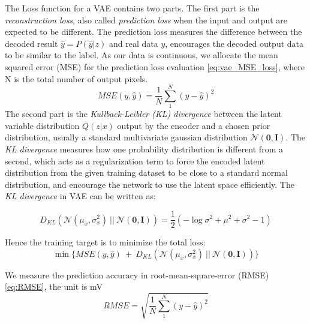 The Loss function for a VAE contains two parts. The first part is the \textit{reconstruction loss}, also called \textit{prediction loss} when the input and output are expected to be different. The prediction loss measures the difference between the decoded result $\hat{y} = P(\hat{y}|z)$ and real data $y$, encourages the decoded output data to be similar to the label. As our data is continuous, we allocate the mean squared error (MSE) for the prediction loss evaluation \eqref{eq:vae_MSE_loss}, where N is the total number of output pixels.
\begin{equation}
	\label{eq:vae_MSE_loss}
	\textit{MSE}(y, \hat{y}) = \frac{1}{N} \sum_{1}^{N} ( y - \hat{y})^{2}
\end{equation}
The second part is the \textit{Kullback-Leibler (KL) divergence} between the latent variable distribution $Q(z|x)$ output by the encoder and a chosen prior distribution, usually a standard multivariate gaussian distribution $\mathcal{N}(\textbf{0}, \textbf{I})$. The \textit{KL divergence} measures how one probability distribution is different from a second, which acts as a regularization term to force the encoded latent distribution from the given training dataset to be close to a standard normal distribution, and encourage the network to use the latent space efficiently. 
The \textit{KL divergence} in VAE can be written as:

\begin{equation}
	\label{eq:vae_KLD_loss}
	D_{KL}( \mathcal{N}(\mu_{x}, \sigma_{x}^{2}) ~ || ~ \mathcal{N}(\textbf{0}, \textbf{I} ) )  = \dfrac{1}{2} (-\log\sigma^{2} + \mu^{2} + \sigma^{2} - 1)
\end{equation}

Hence the training target is to minimize the total loss:
\begin{equation}
	\label{eq:vae_total_loss}
	\min  \{ \textit{MSE} (y, \hat{y})  ~ + ~  D_{KL}( \mathcal{N}(\mu_{x}, \sigma_{x}^{2}) ~ || ~ \mathcal{N}(\textbf{0}, \textbf{I} ) )  \}
\end{equation}


We measure the prediction accuracy in root-mean-square-error (RMSE)  \eqref{eq:RMSE}, the unit is mV
\begin{equation}
	\label{eq:RMSE}
	\textit{RMSE} =\sqrt{ \frac{1}{N} \sum_{1}^{N} ( y - \hat{y})^{2} }
\end{equation}





